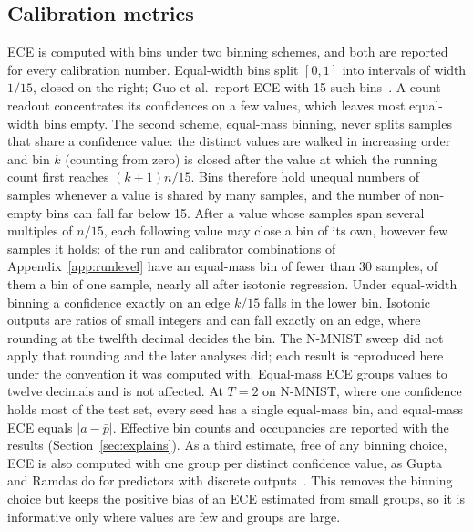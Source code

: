 \documentclass[10pt]{article}
\begin{document}
\subsection{Calibration metrics}
\label{sec:metrics}

ECE is computed with \nBins{} bins under two binning schemes, and both are reported for every %
calibration number. Equal-width bins split $[0,1]$ into intervals of width $1/15$, closed on the
right; Guo et al.\ report ECE with 15 such bins~\citep{guo2017calibration}. A count readout %
concentrates its confidences on a few values, which leaves most equal-width bins empty. The
second scheme, equal-mass binning, never splits samples that share a confidence value: the
distinct values are walked in increasing order and bin $k$ (counting from zero) is closed after
the value at which the running count first reaches $(k+1)n/15$. Bins therefore hold unequal
numbers of samples whenever a value is shared by many samples, and the number of non-empty bins can
fall far below 15. After a value whose samples span several multiples of $n/15$, each following
value may close a bin of its own, however few samples it holds: \emSmallBinRows{} of the %
\cmRows{} run and calibrator combinations of Appendix~\ref{app:runlevel} have an equal-mass bin of
fewer than 30 samples, \emOneSampleRows{} of them a bin of one sample, nearly all after isotonic %
regression. Under equal-width binning a confidence exactly on an edge $k/15$ falls in the lower
bin. Isotonic outputs are ratios of small integers and can fall exactly on an edge, where rounding
at the twelfth decimal decides the bin. The N-MNIST sweep did not apply that rounding and the later
analyses did; each result is reproduced here under the convention it was computed with. Equal-mass ECE groups values to twelve decimals and is not affected. At $T=2$ on N-MNIST, where one confidence holds most of the test set, every seed has %
a single equal-mass bin, and equal-mass ECE equals $|a-\bar p|$. Effective bin
counts and occupancies are reported with the results (Section~\ref{sec:explains}). As a third
estimate, free of any binning choice, ECE is also computed with one group per distinct confidence
value, as Gupta and Ramdas do for predictors with discrete outputs~\citep{gupta2022toplabel}. This %
removes the binning choice but keeps the positive bias of an ECE estimated from small groups, so
it is informative only where values are few and groups are large.
\end{document}
